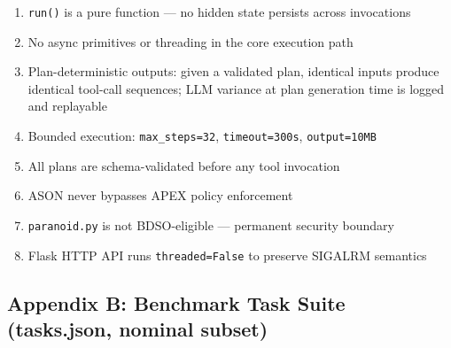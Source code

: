 \documentclass[
]{article}
\providecommand{\tightlist}{%
  \setlength{\itemsep}{0pt}\setlength{\parskip}{0pt}}
\begin{document}
\begin{enumerate}
\def\labelenumi{\arabic{enumi}.}
\tightlist
\item
  \texttt{run()} is a pure function --- no hidden state persists across
  invocations
\item
  No async primitives or threading in the core execution path
\item
  Plan-deterministic outputs: given a validated plan, identical inputs
  produce identical tool-call sequences; LLM variance at plan generation
  time is logged and replayable
\item
  Bounded execution: \texttt{max\_steps=32}, \texttt{timeout=300s},
  \texttt{output=10MB}
\item
  All plans are schema-validated before any tool invocation
\item
  ASON never bypasses APEX policy enforcement
\item
  \texttt{paranoid.py} is not BDSO-eligible --- permanent security
  boundary
\item
  Flask HTTP API runs \texttt{threaded=False} to preserve SIGALRM
  semantics
\end{enumerate}

\subsection{Appendix B: Benchmark Task Suite (tasks.json, nominal
subset)}\label{appendix-b-benchmark-task-suite-tasksjson-nominal-subset}
\end{document}
